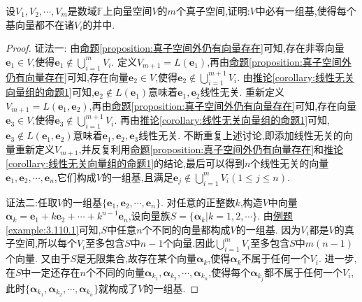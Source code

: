 \documentclass[../../main.tex]{subfiles}%
\begin{document}
\begin{proposition}\label{proposition:真子空间外仍有一组基存在}
设\(V_1,V_2,\cdots,V_m\)是数域\(\mathbb{F}\)上向量空间\(V\)的\(m\)个真子空间,证明:\(V\)中必有一组基,使得每个基向量都不在诸\(V_i\)的并中.
\end{proposition}
\begin{proof}

{\color{blue}证法一:}
由\hyperref[proposition:真子空间外仍有向量存在]{命题\ref{proposition:真子空间外仍有向量存在}}可知,存在非零向量\(\boldsymbol{e}_1\in V\),使得\(\boldsymbol{e}_1\notin\bigcup_{i = 1}^{m}V_i\). 定义\(V_{m + 1}=L(\boldsymbol{e}_1)\),再由\hyperref[proposition:真子空间外仍有向量存在]{命题\ref{proposition:真子空间外仍有向量存在}}可知,存在向量\(\boldsymbol{e}_2\in V\),使得\(\boldsymbol{e}_2\notin\bigcup_{i = 1}^{m + 1}V_i\). 由\hyperref[corollary:线性无关向量组的命题1]{推论\ref{corollary:线性无关向量组的命题1}}可知,\(\boldsymbol{e}_2\notin L(\boldsymbol{e}_1)\)意味着\(\boldsymbol{e}_1,\boldsymbol{e}_2\)线性无关. 重新定义\(V_{m + 1}=L(\boldsymbol{e}_1,\boldsymbol{e}_2)\),再由\hyperref[proposition:真子空间外仍有向量存在]{命题\ref{proposition:真子空间外仍有向量存在}}可知,存在向量\(\boldsymbol{e}_3\in V\),使得\(\boldsymbol{e}_3\notin\bigcup_{i = 1}^{m + 1}V_i\). 再由\hyperref[corollary:线性无关向量组的命题1]{推论\ref{corollary:线性无关向量组的命题1}}可知,\(\boldsymbol{e}_3\notin L(\boldsymbol{e}_1,\boldsymbol{e}_2)\)意味着\(\boldsymbol{e}_1,\boldsymbol{e}_2,\boldsymbol{e}_3\)线性无关. 不断重复上述讨论,即添加线性无关的向量重新定义\(V_{m + 1}\),并反复利用\hyperref[proposition:真子空间外仍有向量存在]{命题\ref{proposition:真子空间外仍有向量存在}}和\hyperref[corollary:线性无关向量组的命题1]{推论\ref{corollary:线性无关向量组的命题1}}的结论,最后可以得到\(n\)个线性无关的向量\(\boldsymbol{e}_1,\boldsymbol{e}_2,\cdots,\boldsymbol{e}_n\),它们构成\(V\)的一组基,且满足\(\boldsymbol{e}_j\notin\bigcup_{i = 1}^{m}V_i(1\leqslant  j\leqslant  n)\). 

{\color{blue}证法二:}任取\(V\)的一组基\(\{\boldsymbol{e}_1,\boldsymbol{e}_2,\cdots,\boldsymbol{e}_n\}\). 对任意的正整数\(k\),构造\(V\)中向量\(\boldsymbol{\alpha}_k=\boldsymbol{e}_1 + k\boldsymbol{e}_2+\cdots + k^{n - 1}\boldsymbol{e}_n\),设向量族\(S = \{\boldsymbol{\alpha}_k|k = 1,2,\cdots\}\). 由\hyperref[example:3.110.1]{例题\ref{example:3.110.1}}可知,\(S\)中任意\(n\)个不同的向量都构成\(V\)的一组基. 因为\(V_i\)都是\(V\)的真子空间,所以每个\(V_i\)至多包含\(S\)中\(n - 1\)个向量.因此$\bigcup_{i=1}^m{V_i}$至多包含$S$中$m(n-1)$个向量.
又由于\(S\)是无限集合,故存在某个向量\(\boldsymbol{\alpha}_k\),使得\(\boldsymbol{\alpha}_k\)不属于任何一个\(V_i\).
进一步,在\(S\)中一定还存在\(n\)个不同的向量\(\boldsymbol{\alpha}_{k_1},\boldsymbol{\alpha}_{k_2},\cdots,\boldsymbol{\alpha}_{k_n}\),使得每个\(\boldsymbol{\alpha}_{k_j}\)都不属于任何一个\(V_i\),此时\(\{\boldsymbol{\alpha}_{k_1},\boldsymbol{\alpha}_{k_2},\cdots,\boldsymbol{\alpha}_{k_n}\}\)就构成了\(V\)的一组基.

\end{proof}
\end{document}
